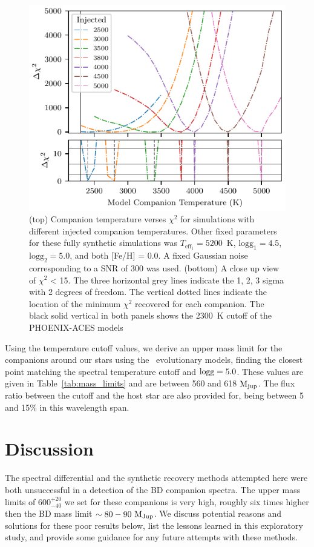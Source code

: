 \documentclass[fleqn,usenatbib]{mnras}
\begin{document}
\begin{figure}
    \centering
    \includegraphics[width=\hsize]{images/chi2_shape_investigation_sigmas.pdf}
    \caption{(top) Companion temperature verses \(\chi^2\) for simulations with different injected companion temperatures. Other fixed parameters for these fully synthetic simulations was \(T_{\textrm{eff}_1}=5200\)~K, \(\textrm{logg}_1=4.5\), \(\textrm{logg}_2=5.0\), and both [Fe/H] = 0.0. A fixed Gaussian noise corresponding to a SNR of 300 was used.
        (bottom) A close up view of \(\chi^2\) < 15. The three horizontal grey lines indicate the 1, 2, 3 sigma with 2 degrees of freedom. The vertical dotted lines indicate the location of the minimum \(\chi^2\) recovered for each companion. The black solid vertical in both panels shows the 2300~K cutoff of the PHOENIX-ACES models}
    \label{fig:injection_shape}
\end{figure}




Using the temperature cutoff values, we derive an upper mass limit for the companions around our stars using the~\cite{baraffe_new_2015} evolutionary models, finding the closest point matching the spectral temperature cutoff and \(\rm logg=5.0\). These values are given in Table~\ref{tab:mass_limits} and are between 560 and 618 \(\rm M_{jup}\). The flux ratio between the cutoff and the host star are also provided for, being between 5 and 15\% in this wavelength span.


\section{Discussion}
\label{sec:discussion}
The spectral differential and the synthetic recovery methods attempted here were both unsuccessful in a detection of the BD companion spectra.  The upper mass limits of \(600^{+20}_{-40} \) we set for these companions is very high, roughly six times higher then the BD mass limit \(\rm\sim 80-90~M_{Jup}\).
We discuss potential reasons and solutions for these poor results below, list the lessons learned in this exploratory study, and provide some guidance for any future attempts with these methods.
\end{document}
